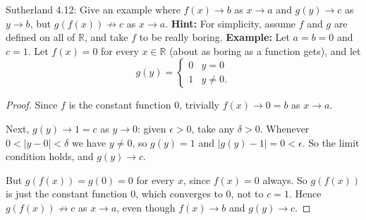 \documentclass[minion]{homework}
\newcommand{\Reals}{\ensuremath{\mathbb R}}%
\begin{document}
\begin{problems}
\problem Sutherland 4.12: Give an example where $f(x) \to b$ as $x \to a$ and $g(y) \to c$ as $y \to b$, but $g(f(x)) \not\to c$ as $x \to a$. \textbf{Hint:} For simplicity,
assume $f$ and $g$ are defined on all of $\Reals$, and take $f$
to be really boring.
\newline
\textbf{Example:} Let $a=b=0$ and $c=1$. Let $f(x) = 0$ for every $x \in \Reals$ (about as boring as a function gets), and let
$$g(y) = \begin{cases} 0 & y = 0 \\ 1 & y \neq 0. \end{cases}$$
\begin{proof}
  Since $f$ is the constant function $0$, trivially $f(x) \to 0 = b$ as $x \to a$.

  Next, $g(y) \to 1 = c$ as $y \to 0$: given $\epsilon > 0$, take any $\delta > 0$. Whenever $0 < |y-0| < \delta$ we have $y \neq 0$, so $g(y) = 1$ and $|g(y) - 1| = 0 < \epsilon$. So the limit condition holds, and $g(y) \to c$.

  But $g(f(x)) = g(0) = 0$ for every $x$, since $f(x) = 0$ always. So $g(f(x))$ is just the constant function $0$, which converges to $0$, not to $c = 1$. Hence $g(f(x)) \not\to c$ as $x \to a$, even though $f(x) \to b$ and $g(y) \to c$.
\end{proof}

\end{problems}
\end{document}
